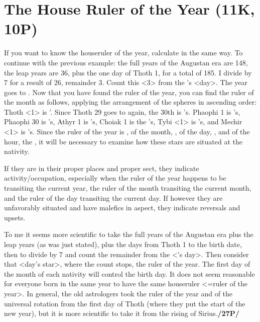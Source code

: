 \section{The House Ruler of the Year (11K, 10P)}
\mnm[0.3cm]
If you want to know the houseruler of the year, calculate in the same way. To continue with the previous example: the full years of the Augustan era are 148, the leap years are 36, plus the one day of Thoth 1, for a total of 185. I divide by 7 for a result of 26, remainder 3. Count this <3> from the \Sun’s
<day>. The year goes to \Mars. 
Now that you have found the ruler of the year, you can find the ruler of the month as follows, applying the arrangement of the spheres in ascending order: Thoth <1> is \Mars’. Since
Thoth 29 goes to \Mars\xspace again, the 30th is \Mercury’s. Phaophi 1 is \Jupiter’s, Phaophi 30 is \Venus’s, Athyr
1 is \Saturn’s, Choiak 1 is the \Moon’s, Tybi <1> is \Mercury’s, and Mechir <1> is \Venus’s. Since the
ruler of the year is \Mars, of the month, \Venus, of the day, \Mercury, and of the hour, the \Sun, it will be necessary to examine how these stars are situated at the nativity. 

\mndl[0.2cm]
If they are in their proper places and proper sect, they indicate activity/occupation, especially when the ruler of the year happens to be transiting the current year, the ruler of the month transiting the current month, and the ruler of the day transiting the current day. If however they are unfavorably situated and have malefics in aspect, they indicate reversals
and upsets.

To me it seems more scientific to take the full years of the Augustan era plus the leap years (as was just stated), plus the days from Thoth 1 to the birth date, then to divide by 7 and count the remainder from the \Sun<’s day>. Then consider that <day’s star>, where the count stops, the ruler of the year. The first day of the month of each nativity will control the birth day. It does not seem reasonable for everyone born in the same year to have the same houseruler <=ruler of the year>. In general, the old astrologers took the ruler of the year and of the universal rotation from the first day of Thoth (where they put the start of the new year), but it is more scientific to take it from the rising of Sirius.\textbf{/27P/}
\newpage